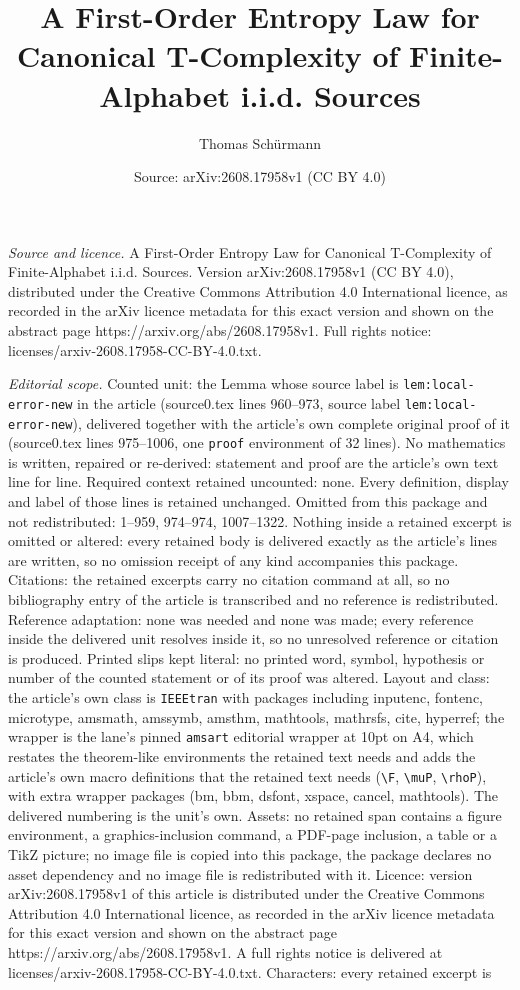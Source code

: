 \documentclass[10pt,a4paper]{amsart}
\title[A First-Order Entropy Law for Canonical T-Complexity of Fini]{A First-Order Entropy Law for Canonical T-Complexity of Finite-Alphabet i.i.d. Sources}
\author{Thomas Sch\"urmann}
\date{Source: arXiv:2608.17958v1 (CC BY 4.0)}
\begin{document}
\maketitle

\noindent\emph{Source and licence.} A First-Order Entropy Law for Canonical T-Complexity of Finite-Alphabet i.i.d. Sources. Version arXiv:2608.17958v1 (CC BY 4.0), distributed under the Creative Commons Attribution 4.0 International licence, as recorded in the arXiv licence metadata for this exact version and shown on the abstract page https://arxiv.org/abs/2608.17958v1. Full rights notice: licenses/arxiv-2608.17958-CC-BY-4.0.txt.\par\smallskip

\noindent\textit{Editorial scope.} Counted unit: the Lemma whose source label is \texttt{lem:local-error-new} in the article (source0.tex lines 960--973, source label \texttt{lem:local-error-new}), delivered together with the article's own complete original proof of it (source0.tex lines 975--1006, one \texttt{proof} environment of 32 lines). No mathematics is written, repaired or re-derived: statement and proof are the article's own text line for line. Required context retained uncounted: none. Every definition, display and label of those lines is retained unchanged. Omitted from this package and not redistributed: 1--959, 974--974, 1007--1322. Nothing inside a retained excerpt is omitted or altered: every retained body is delivered exactly as the article's lines are written, so no omission receipt of any kind accompanies this package. Citations: the retained excerpts carry no citation command at all, so no bibliography entry of the article is transcribed and no reference is redistributed. Reference adaptation: none was needed and none was made; every reference inside the delivered unit resolves inside it, so no unresolved reference or citation is produced. Printed slips kept literal: no printed word, symbol, hypothesis or number of the counted statement or of its proof was altered. Layout and class: the article's own class is \texttt{IEEEtran} with packages including inputenc, fontenc, microtype, amsmath, amssymb, amsthm, mathtools, mathrsfs, cite, hyperref; the wrapper is the lane's pinned \texttt{amsart} editorial wrapper at 10pt on A4, which restates the theorem-like environments the retained text needs and adds the article's own macro definitions that the retained text needs (\texttt{\textbackslash F}, \texttt{\textbackslash muP}, \texttt{\textbackslash rhoP}), with extra wrapper packages (bm, bbm, dsfont, xspace, cancel, mathtools). The delivered numbering is the unit's own. Assets: no retained span contains a figure environment, a graphics-inclusion command, a PDF-page inclusion, a table or a TikZ picture; no image file is copied into this package, the package declares no asset dependency and no image file is redistributed with it. Licence: version arXiv:2608.17958v1 of this article is distributed under the Creative Commons Attribution 4.0 International licence, as recorded in the arXiv licence metadata for this exact version and shown on the abstract page https://arxiv.org/abs/2608.17958v1. A full rights notice is delivered at licenses/arxiv-2608.17958-CC-BY-4.0.txt. Characters: every retained excerpt is 
\end{document}
